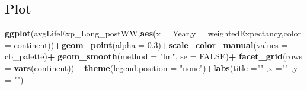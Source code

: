 \documentclass[]{article}
\newenvironment{Shaded}{\begin{snugshade}}{\end{snugshade}}
\newcommand{\DataTypeTok}[1]{\textcolor[rgb]{0.13,0.29,0.53}{#1}}
\newcommand{\DecValTok}[1]{\textcolor[rgb]{0.00,0.00,0.81}{#1}}
\newcommand{\FloatTok}[1]{\textcolor[rgb]{0.00,0.00,0.81}{#1}}
\newcommand{\KeywordTok}[1]{\textcolor[rgb]{0.13,0.29,0.53}{\textbf{#1}}}
\newcommand{\NormalTok}[1]{#1}
\newcommand{\OperatorTok}[1]{\textcolor[rgb]{0.81,0.36,0.00}{\textbf{#1}}}
\newcommand{\OtherTok}[1]{\textcolor[rgb]{0.56,0.35,0.01}{#1}}
\newcommand{\StringTok}[1]{\textcolor[rgb]{0.31,0.60,0.02}{#1}}
\begin{document}
\begin{Shaded}
\end{Shaded}

\hypertarget{plot}{%
\subsection{Plot}\label{plot}}

\begin{Shaded}
\begin{Highlighting}[]
\KeywordTok{ggplot}\NormalTok{(avgLifeExp_Long_postWW,}\KeywordTok{aes}\NormalTok{(}\DataTypeTok{x =}\NormalTok{ Year,}\DataTypeTok{y =}\NormalTok{ weightedExpectancy,}\DataTypeTok{color =}\NormalTok{ continent))}\OperatorTok{+}\KeywordTok{geom_point}\NormalTok{(}\DataTypeTok{alpha =} \FloatTok{0.3}\NormalTok{)}\OperatorTok{+}\KeywordTok{scale_color_manual}\NormalTok{(}\DataTypeTok{values =}\NormalTok{ cb_palette)}\OperatorTok{+}
\StringTok{  }\KeywordTok{geom_smooth}\NormalTok{(}\DataTypeTok{method =} \StringTok{"lm"}\NormalTok{, }\DataTypeTok{se =} \OtherTok{FALSE}\NormalTok{)}\OperatorTok{+}\StringTok{ }\KeywordTok{facet_grid}\NormalTok{(}\DataTypeTok{rows =} \KeywordTok{vars}\NormalTok{(continent))}\OperatorTok{+}
\StringTok{  }\KeywordTok{theme}\NormalTok{(}\DataTypeTok{legend.position =} \StringTok{"none"}\NormalTok{)}\OperatorTok{+}\KeywordTok{labs}\NormalTok{(}\DataTypeTok{title =}\StringTok{""}\NormalTok{ ,}\DataTypeTok{x =}\StringTok{""}\NormalTok{ ,}\DataTypeTok{y =} \StringTok{""}\NormalTok{)}
\end{Highlighting}
\end{Shaded}
\end{document}
